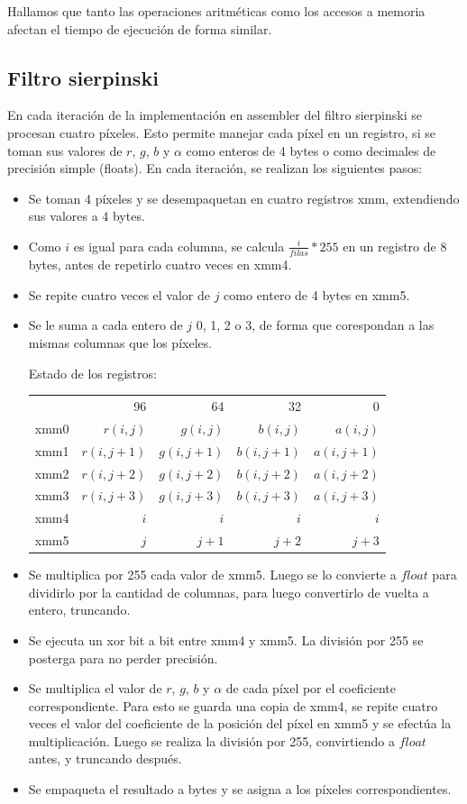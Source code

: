 \documentclass[a4paper]{article}
\begin{document}
\smallskip

Hallamos que tanto las operaciones aritméticas como los accesos a memoria afectan el tiempo de ejecución de forma similar. %

\subsection{Filtro sierpinski}
En cada iteración de la implementación en assembler del filtro sierpinski se procesan cuatro píxeles. Esto permite manejar cada píxel en un registro, si se toman sus valores de $r$, $g$, $b$ y $\alpha$ como enteros de 4 bytes o como decimales de precisión simple (floats). En cada iteración, se realizan los siguientes pasos: 
\begin{itemize}
\item Se toman 4 píxeles y se desempaquetan en cuatro registros xmm, extendiendo sus valores a 4 bytes.
\item Como $i$ es igual para cada columna, se calcula $\frac{i}{filas}*255$ en un registro de 8 bytes, antes de repetirlo cuatro veces en xmm4.
\item Se repite cuatro veces el valor de $j$ como entero de 4 bytes en xmm5.
\item Se le suma a cada entero de $j$ 0, 1, 2 o 3, de forma que corespondan a las mismas columnas que los píxeles. 

Estado de los registros:

\begin{tabular}{c r|r|r|r} 
& 96 & 64 & 32 & 0 \\
xmm0 & $r(i,j)$ & $g(i,j)$ & $b(i,j)$ & $a(i,j)$ \\
xmm1 & $r(i,j+1)$ & $g(i,j+1)$ & $b(i,j+1)$ & $a(i,j+1)$ \\
xmm2 & $r(i,j+2)$ & $g(i,j+2)$ & $b(i,j+2)$ & $a(i,j+2)$ \\
xmm3 & $r(i,j+3)$ & $g(i,j+3)$ & $b(i,j+3)$ & $a(i,j+3)$ \\
xmm4 & $i$ & $i$ & $i$ & $i$ \\
xmm5 & $j$ & $j+1$ & $j+2$ & $j+3$ \\
\end{tabular}

\item Se multiplica por 255 cada valor de xmm5. Luego se lo convierte a $float$ para dividirlo por la cantidad de columnas, para luego convertirlo de vuelta a entero, truncando.
\item Se ejecuta un xor bit a bit entre xmm4 y xmm5. La división por 255 se posterga para no perder precisión.
\item Se multiplica el valor de $r$, $g$, $b$ y $\alpha$ de cada píxel por el coeficiente correspondiente. Para esto se guarda una copia de xmm4, se repite cuatro veces el valor del coeficiente de la posición del píxel en xmm5 y se efectúa la multiplicación. Luego se realiza la división por 255, convirtiendo a $float$ antes, y truncando después. 
\item Se empaqueta el resultado a bytes y se asigna a los píxeles correspondientes.
\end{itemize}
\end{document}
